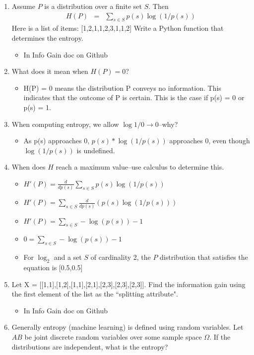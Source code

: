 \documentclass{article}
\begin{document}
\begin{enumerate}
  \item Assume $P$ is a distribution over a finite set $S$.  Then
\begin{eqnarray}
H(P) &=& \sum_{s \in S}p(s)\log (1/p(s))
\end{eqnarray}
Here is a list of items: [1,2,1,1,2,3,1,1,2]
Write a Python function that determines the entropy.
\begin{itemize}
    \item In Info Gain doc on Github
\end{itemize}
\item What does it mean when $H(P) = 0$?
\begin{itemize}
    \item H(P) = 0 means the distribution P conveys no information. This indicates that the outcome of P is certain. This is the case if p(s) = 0 or p(s) = 1.
\end{itemize}
\item When computing entropy, we allow $\log 1/0 \rightarrow 0$--why?
\begin{itemize}
    \item As p(s) approaches 0, $p(s) * \log (1/p(s))$ approaches 0, even though $\log (1/p(s))$ is undefined.
\end{itemize}
\item When does $H$ reach a maximum value--use calculus to determine this.
\begin{itemize}
    \item $H'(P) = \frac{d}{dp(s)} \sum_{s \in S}p(s)\log (1/p(s))$
    \item $H'(P) = \sum_{s \in S}\frac{d}{dp(s)}(p(s)\log (1/p(s)))$
    \item $H'(P) = \sum_{s \in S}-\log (p(s)) -1$
    \item $0 = \sum_{s \in S}-\log (p(s)) -1$
    \item For $\log_2$ and a set $S$ of cardinality 2, the $P$ distribution that satisfies the equation  is [0.5,0.5]
\end{itemize}
\item Let X = [[1,1],[1,2],[1,1],[2,1],[2,3],[2,3],[2,3]].  Find the information gain using the first element of the list as the ``splitting attribute".
\begin{itemize}
    \item In Info Gain doc on Github
\end{itemize}
\item Generally entropy  (machine learning) is defined using random variables.  Let $AB$ be joint discrete random variables over some sample space $\Omega$.  If the distributions are independent, what is the entropy?

\end{enumerate}
\end{document}

